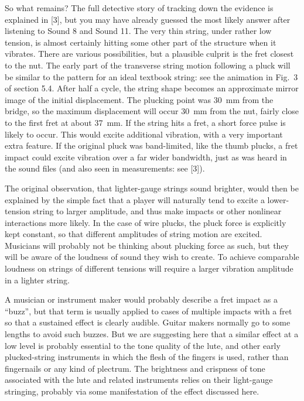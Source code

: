   So what remains? The full detective story of tracking down the evidence is 
  explained in [3], but you may have already guessed the most likely answer 
  after listening to Sound 8 and Sound 11. The very thin string, under rather 
  low tension, is almost certainly hitting some other part of the structure 
  when it vibrates. There are various possibilities, but a plausible culprit is 
  the fret closest to the nut. The early part of the transverse string motion 
  following a pluck will be similar to the pattern for an ideal textbook 
  string: see the animation in Fig.\ 3 of section 5.4. After half a cycle, the 
  string shape becomes an approximate mirror image of the initial displacement. 
  The plucking point was 30~mm from the bridge, so the maximum displacement 
  will occur 30~mm from the nut, fairly close to the first fret at about 37~mm. 
  If the string hits a fret, a short force pulse is likely to occur. This would 
  excite additional vibration, with a very important extra feature. If the 
  original pluck was band-limited, like the thumb plucks, a fret impact could 
  excite vibration over a far wider bandwidth, just as was heard in the sound 
  files (and also seen in measurements: see [3]). 

  The original observation, that lighter-gauge strings sound brighter, would 
  then be explained by the simple fact that a player will naturally tend to 
  excite a lower-tension string to larger amplitude, and thus make impacts or 
  other nonlinear interactions more likely. In the case of wire plucks, the 
  pluck force is explicitly kept constant, so that different amplitudes of 
  string motion are excited. Musicians will probably not be thinking about 
  plucking force as such, but they will be aware of the loudness of sound they 
  wish to create. To achieve comparable loudness on strings of different 
  tensions will require a larger vibration amplitude in a lighter string. 

  A musician or instrument maker would probably describe a fret impact as a 
  “buzz”, but that term is usually applied to cases of multiple impacts with a 
  fret so that a sustained effect is clearly audible. Guitar makers normally go 
  to some lengths to avoid such buzzes. But we are suggesting here that a 
  similar effect at a low level is probably essential to the tone quality of 
  the lute, and other early plucked-string instruments in which the flesh of 
  the fingers is used, rather than fingernails or any kind of plectrum. The 
  brightness and crispness of tone associated with the lute and related 
  instruments relies on their light-gauge stringing, probably via some 
  manifestation of the effect discussed here. 

